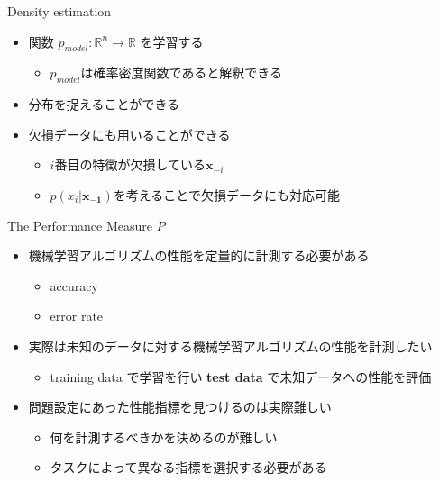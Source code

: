 \documentclass[dvipdfmx, 10pt]{beamer}
\begin{document}
\begin{frame}{Density estimation}
  \begin{itemize}
    \item 関数 $p_{model} : \mathbb{R} ^ {n} \to \mathbb{R}$ を学習する
    \begin{itemize}
      \item $p_{model}$は確率密度関数であると解釈できる
    \end{itemize}
    \item 分布を捉えることができる
    \item 欠損データにも用いることができる
    \begin{itemize}
      \item $i$番目の特徴が欠損している$\bm{x}_{-i}$
      \item $p(x_{i}|\bm{x_{-1}})$を考えることで欠損データにも対応可能
    \end{itemize}
  \end{itemize}
\end{frame}


\begin{frame}{The Performance Measure $P$}
  \begin{itemize}
    \item 機械学習アルゴリズムの性能を定量的に計測する必要がある
    \begin{itemize}
      \item accuracy
      \item error rate
    \end{itemize}
    \item 実際は未知のデータに対する機械学習アルゴリズムの性能を計測したい
    \begin{itemize}
      \item training data で学習を行い {\bf test data} で未知データへの性能を評価
    \end{itemize}
    \item 問題設定にあった性能指標を見つけるのは実際難しい
    \begin{itemize}
      \item 何を計測するべきかを決めるのが難しい
      \item タスクによって異なる指標を選択する必要がある
    \end{itemize}
  \end{itemize}
\end{frame}

\end{document}
